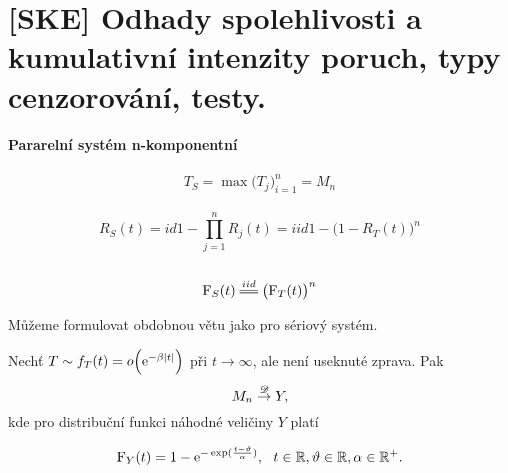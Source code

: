 \chapter{[SKE] Odhady spolehlivosti a kumulativní intenzity poruch, typy cenzorování, testy.}


\subsubsection{Pararelní systém n-komponentní}
$$T_S = \max{\big(T_j\big)_{i=1}^n} =  M_n$$\\
$$R_S(t)\equal{id} 1 -  \prod_{j=1}^n R_j(t) \equal{iid}  1 - \big(1 -R_T(t) \big)^n$$ \\
$$\FF_S(t) \equal{iid} \big(\FF_T(t)\big)^n$$

Můžeme formulovat obdobnou větu jako pro sériový systém.

\begin{theorem}
	Nechť $T \sim f_T(t) = o\Big(\mathrm{e}^{-\beta\left|t\right|} \Big)$ při $t \rightarrow \infty$, ale není useknuté zprava. Pak 
	$$M_n  \stackrel{\mathscr{D}}{\to} Y  ,$$ kde
	pro distribuční funkci náhodné veličiny $Y$ platí
	
	$$ \mathrm{F}_Y(t)  = 1 - \mathrm{e}^{-\exp(\frac{t-\vartheta}{\alpha} )},~~t \in \mathbb{R}, \vartheta \in \mathbb{R}, \alpha \in\mathbb{R}^+.  $$
\end{theorem}


